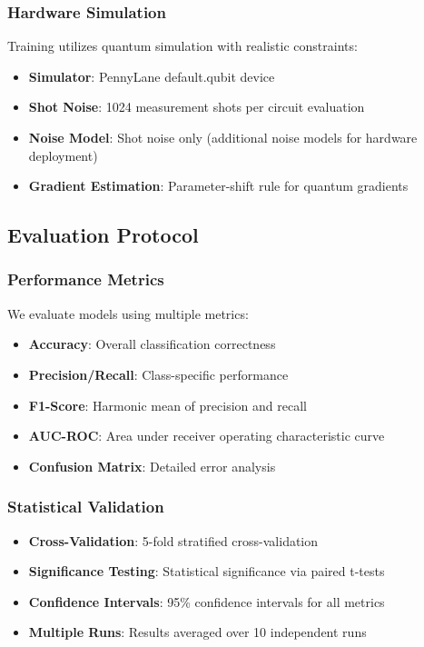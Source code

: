 \documentclass[conference]{IEEEtran}
\begin{document}
\subsubsection{Hardware Simulation}
Training utilizes quantum simulation with realistic constraints:
\begin{itemize}
    \item \textbf{Simulator}: PennyLane default.qubit device
    \item \textbf{Shot Noise}: 1024 measurement shots per circuit evaluation
    \item \textbf{Noise Model}: Shot noise only (additional noise models for hardware deployment)
    \item \textbf{Gradient Estimation}: Parameter-shift rule for quantum gradients
\end{itemize}

\subsection{Evaluation Protocol}

\subsubsection{Performance Metrics}
We evaluate models using multiple metrics:
\begin{itemize}
    \item \textbf{Accuracy}: Overall classification correctness
    \item \textbf{Precision/Recall}: Class-specific performance
    \item \textbf{F1-Score}: Harmonic mean of precision and recall
    \item \textbf{AUC-ROC}: Area under receiver operating characteristic curve
    \item \textbf{Confusion Matrix}: Detailed error analysis
\end{itemize}

\subsubsection{Statistical Validation}
\begin{itemize}
    \item \textbf{Cross-Validation}: 5-fold stratified cross-validation
    \item \textbf{Significance Testing}: Statistical significance via paired t-tests
    \item \textbf{Confidence Intervals}: 95\% confidence intervals for all metrics
    \item \textbf{Multiple Runs}: Results averaged over 10 independent runs
\end{itemize}
\end{document}
